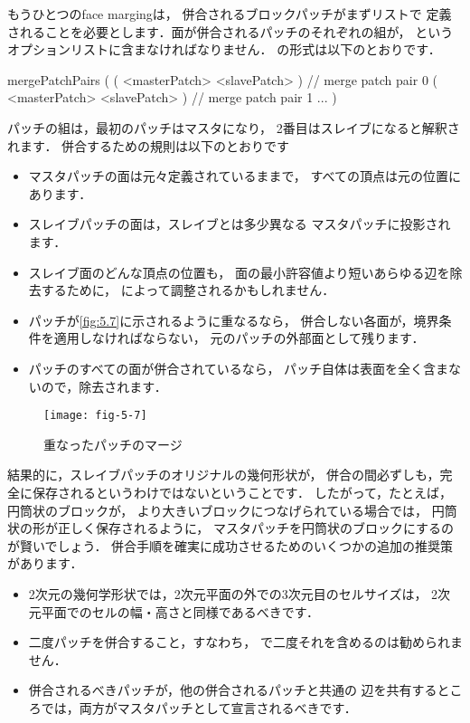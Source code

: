 もうひとつのface margingは，
併合されるブロックパッチがまずリストで
定義されることを必要とします．面が併合されるパッチのそれぞれの組が，
というオプションリストに含まなければなりません．
の形式は以下のとおりです．
\begin{OFverbatim}[file]
mergePatchPairs
(
    ( <masterPatch> <slavePatch> ) // merge patch pair 0
    ( <masterPatch> <slavePatch> ) // merge patch pair 1
    ...
)
\end{OFverbatim}
パッチの組は，最初のパッチはマスタになり，
2番目はスレイブになると解釈されます．
併合するための規則は以下のとおりです
\begin{itemize}
 \item マスタパッチの面は元々定義されているままで，
       すべての頂点は元の位置にあります．
 \item スレイブパッチの面は，スレイブとは多少異なる
       マスタパッチに投影されます．
 \item スレイブ面のどんな頂点の位置も，
       面の最小許容値より短いあらゆる辺を除去するために，
       によって調整されるかもしれません．
 \item パッチが\autoref{fig:5.7}に示されるように重なるなら，
       併合しない各面が，境界条件を適用しなければならない，
       元のパッチの外部面として残ります．
 \item パッチのすべての面が併合されているなら，
       パッチ自体は表面を全く含まないので，除去されます．
\end{itemize}


\begin{figure}[ht]
 \texttt{[image: fig-5-7]}
 \caption{重なったパッチのマージ}
 \label{fig:5.7}
\end{figure}


結果的に，スレイブパッチのオリジナルの幾何形状が，
併合の間必ずしも，完全に保存されるというわけではないということです．
したがって，たとえば，円筒状のブロックが，
より大きいブロックにつなげられている場合では，
円筒状の形が正しく保存されるように，
マスタパッチを円筒状のブロックにするのが賢いでしょう．
併合手順を確実に成功させるためのいくつかの追加の推奨策があります．
\begin{itemize}
 \item 2次元の幾何学形状では，2次元平面の外での3次元目のセルサイズは，
       2次元平面でのセルの幅・高さと同様であるべきです．
 \item 二度パッチを併合すること，すなわち，
       で二度それを含めるのは勧められません．
 \item 併合されるべきパッチが，他の併合されるパッチと共通の
       辺を共有するところでは，両方がマスタパッチとして宣言されるべきです．
\end{itemize}


